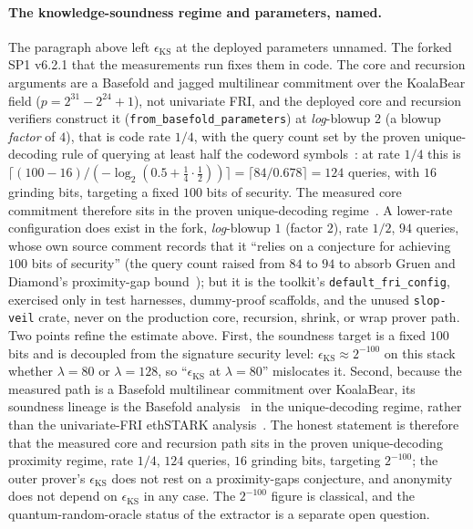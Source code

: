 \paragraph{The knowledge-soundness regime and parameters, named.}
The paragraph above left $\epsilon_{\mathrm{KS}}$ at the deployed parameters unnamed. The forked SP1 v6.2.1 that the measurements run fixes them in code. The core and recursion arguments are a Basefold and jagged multilinear commitment over the KoalaBear field ($p=2^{31}-2^{24}+1$), not univariate FRI, and the deployed core and recursion verifiers construct it (\texttt{from\_basefold\_parameters}) at \emph{log}-blowup $2$ (a blowup \emph{factor} of $4$), that is code rate $1/4$, with the query count set by the proven unique-decoding rule of querying at least half the codeword symbols~\cite{cryptoeprint:2020/654}: at rate $1/4$ this is $\lceil (100-16)/(-\log_2(0.5+\tfrac14\cdot\tfrac12))\rceil=\lceil 84/0.678\rceil=124$ queries, with $16$ grinding bits, targeting a fixed $100$ bits of security. The measured core commitment therefore sits in the proven unique-decoding regime~\cite{habock2024listdecoding}. A lower-rate configuration does exist in the fork, \emph{log}-blowup $1$ (factor $2$), rate $1/2$, $94$ queries, whose own source comment records that it ``relies on a conjecture for achieving $100$ bits of security'' (the query count raised from $84$ to $94$ to absorb Gruen and Diamond's proximity-gap bound~\cite{gruendiamond2024}); but it is the toolkit's \texttt{default\_fri\_config}, exercised only in test harnesses, dummy-proof scaffolds, and the unused \texttt{slop-veil} crate, never on the production core, recursion, shrink, or wrap prover path. Two points refine the estimate above. First, the soundness target is a fixed $100$ bits and is decoupled from the signature security level: $\epsilon_{\mathrm{KS}}\approx2^{-100}$ on this stack whether $\lambda=80$ or $\lambda=128$, so ``$\epsilon_{\mathrm{KS}}$ at $\lambda=80$'' mislocates it. Second, because the measured path is a Basefold multilinear commitment over KoalaBear, its soundness lineage is the Basefold analysis~\cite{basefold2023} in the unique-decoding regime, rather than the univariate-FRI ethSTARK analysis~\cite{ethstark}. The honest statement is therefore that the measured core and recursion path sits in the proven unique-decoding proximity regime, rate $1/4$, $124$ queries, $16$ grinding bits, targeting $2^{-100}$; the outer prover's $\epsilon_{\mathrm{KS}}$ does not rest on a proximity-gaps conjecture, and anonymity does not depend on $\epsilon_{\mathrm{KS}}$ in any case. The $2^{-100}$ figure is classical, and the quantum-random-oracle status of the extractor is a separate open question.

